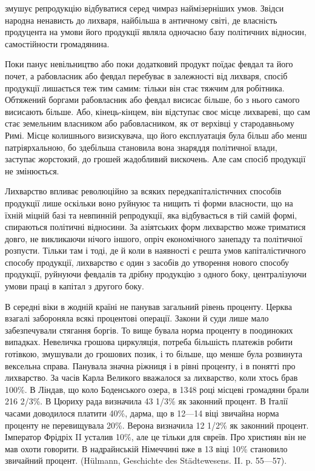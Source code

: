 \parcont{}  %
змушує репродукцію відбуватися серед чимраз наймізерніших умов. Звідси народна
ненависть до лихваря, найбільша в античному світі, де власність продуцента на
умови його продукції являла одночасно базу політичних відносин, самостійности
громадянина.

Поки панує невільництво або поки додатковий продукт поїдає февдал та
його почет, а рабовласник або февдал перебуває в залежності від лихваря,
спосіб продукції лишається теж тим самим: тільки він стає тяжчим для робітника.
Обтяжений боргами рабовласник або февдал висисає більше, бо з нього
самого висисають більше. Або, кінець-кінцем, він відступає своє місце лихвареві,
що сам стає земельним власником або рабовласником, як от верхівці
у стародавньому Римі. Місце колишнього визискувача, що його експлуатація
була більш або менш патріярхальною, бо здебільша становила вона знаряддя
політичної влади, заступає жорстокий, до грошей жадобливий вискочень. Але сам
спосіб продукції не змінюється.

Лихварство впливає революційно за всяких передкапіталістнчних способів
продукції лише оскільки воно руйнуює та нищить ті форми власности, що
на їхній міцній базі та невпинній репродукції, яка відбувається в тій самій
формі, спираються політичні відносини. За азіятських форм лихварство може
триматися довго, не викликаючи нічого іншого, опріч економічного занепаду та
політичної розпусти. Тільки там і тоді, де й коли в наявності є решта умов капіталістичного
способу продукції, лихварство є один з засобів до утворення
нового способу продукції, руйнуючи февдалів та дрібну продукцію з одного боку,
централізуючи умови праці в капітал з другого боку.

В середні віки в жодній країні не панував загальний рівень проценту.
Церква взагалі забороняла всякі процентові операції. Закони й суди лише мало
забезпечували стягання боргів. То вище бувала норма проценту в поодиноких
випадках. Невеличка грошова циркуляція, потреба більшість платежів робити
готівкою, змушували до грошових позик, і то більше, що менше була розвинута
вексельна справа. Панувала значна ріжниця і в рівні проценту, і в понятті про
лихварство. За часів Карла Великого вважалося за лихварство, коли хтось брав
100\%. В Ліндав, що коло Боденського озера, в 1348 році місцеві громадяни брали
216 2/3\%. В Цюриху рада визначила 43 1/3\% як законний процент. В Італії часами
доводилося платити 40\%, дарма, що в 12—14 віці звичайна норма проценту
не перевищувала 20\%. Верона визначила 12 1/2\% як законний процент. Імператор
Фрідріх II усталив 10\%, але це тільки для євреїв. Про християн він
не мав охоти говорити. В надрайнській Німеччині вже в 13 віці 10\% становило
звичайний процент. (Hülmann, Geschichte des Städtewesens. II. p. 55—57).

